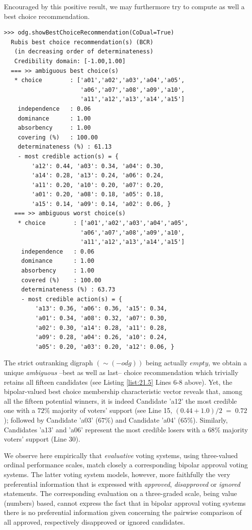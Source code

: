 Encouraged by this positive result, we may furthermore try to compute as well a best choice recommendation.
\begin{lstlisting}[caption={Computing a best social choice recommendation},label=list:21.5]
>>> odg.showBestChoiceRecommendation(CoDual=True)
  Rubis best choice recommendation(s) (BCR)
   (in decreasing order of determinateness)   
   Credibility domain: [-1.00,1.00]
  === >> ambiguous best choice(s) 
   * choice        : ['a01','a02','a03','a04','a05',
                      'a06','a07','a08','a09','a10',
                      'a11','a12','a13','a14','a15']
    independence   : 0.06
    dominance      : 1.00
    absorbency     : 1.00
    covering (%)   : 100.00
    determinateness (%) : 61.13
    - most credible action(s) = {
        'a12': 0.44, 'a03': 0.34, 'a04': 0.30,
        'a14': 0.28, 'a13': 0.24, 'a06': 0.24,
        'a11': 0.20, 'a10': 0.20, 'a07': 0.20,
        'a01': 0.20, 'a08': 0.18, 'a05': 0.18,
        'a15': 0.14, 'a09': 0.14, 'a02': 0.06, }
   === >> ambiguous worst choice(s)
    * choice        : ['a01','a02','a03','a04','a05',
                      'a06','a07','a08','a09','a10',
                      'a11','a12','a13','a14','a15']
     independence   : 0.06
     dominance      : 1.00
     absorbency     : 1.00
     covered (%)    : 100.00
     determinateness (%) : 63.73
     - most credible action(s) = {
         'a13': 0.36, 'a06': 0.36, 'a15': 0.34,
         'a01': 0.34, 'a08': 0.32, 'a07': 0.30,
         'a02': 0.30, 'a14': 0.28, 'a11': 0.28,
         'a09': 0.28, 'a04': 0.26, 'a10': 0.24,
         'a05': 0.20, 'a03': 0.20, 'a12': 0.06, }
\end{lstlisting}
The strict outranking digraph $(\sim (-odg))$ being actually $empty$, we obtain a unique \emph{ambiguous} --best as well as last-- choice recommendation which trivially retains all fifteen candidates (see Listing \ref{list:21.5} Lines 6-8 above). Yet, the bipolar-valued best choice membership characteristic vector reveals that, among all the fifteen potential winners, it is indeed Candidate 'a12' the most credible one with a $72\%$ majority of voters' support (see Line 15, $(0.44 + 1.0)/2\;=\; 0.72$); followed by Candidate 'a03' ($67\%$) and Candidate 'a04' ($65\%$). Similarly, Candidates 'a13' and 'a06' represent the most credible losers with a $68\%$ majority voters' support (Line 30).

We observe here empirically that \emph{evaluative} voting systems, using three-valued ordinal performance scales, match closely a corresponding bipolar approval voting systems. The latter voting system models, however, more faithfully the very preferential information that is expressed with \emph{approved}, \emph{disapproved} or \emph{ignored} statements. The corresponding evaluation on a three-graded scale, being value (numbers) based, cannot express the fact that in bipolar approval voting systems there is no preferential information given concerning the pairwise comparison of all approved, respectively disapproved or ignored candidates.

